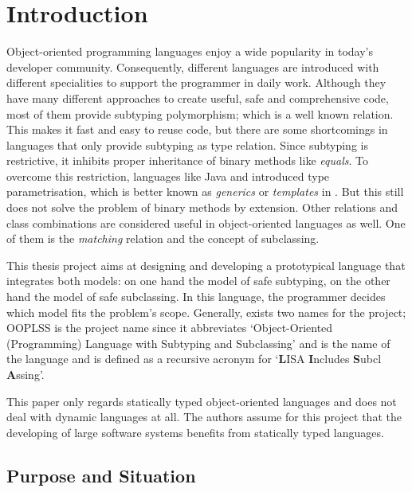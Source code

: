 \chapter{Introduction}
Object-oriented programming languages enjoy a wide popularity in
today's developer community. Consequently, different languages are
introduced with different specialities to support the programmer in
daily work. Although they have many different approaches to create
useful, safe and comprehensive code, most of them provide subtyping
polymorphism; which is a well known relation. This makes it fast and
easy to reuse code, but there are some shortcomings in languages that
only provide subtyping as type relation. Since subtyping is restrictive,
it inhibits proper inheritance of binary methods like \emph{equals}. To
overcome this restriction, languages like Java and \cs introduced
type parametrisation, which is better known as \emph{generics} or
\emph{templates} in \cpp. But this still does not solve the problem of
binary methods by extension. Other relations and class combinations are
considered useful in object-oriented languages as well. One of them is
the \emph{matching} relation and the concept of subclassing.

This thesis project aims at designing and developing a
prototypical language \ooplss that integrates both models: on one
hand the model of safe subtyping, on the other hand the model of
safe subclassing. In this language, the programmer decides which
model fits the problem's scope. Generally, exists two names for the
project; OOPLSS is the project name since it
abbreviates `Object-Oriented (Programming) Language with Subtyping and
Subclassing' and \ooplss is the name of the language and is defined
as a recursive acronym for `{\bf L}ISA {\bf I}ncludes {\bf S}ubcl{\bf
A}ssing'.

This paper only regards statically typed object-oriented languages and does
not deal with dynamic languages at all. The authors assume for this project
that the developing of large software systems benefits from statically
typed languages.

\section{Purpose and Situation}
